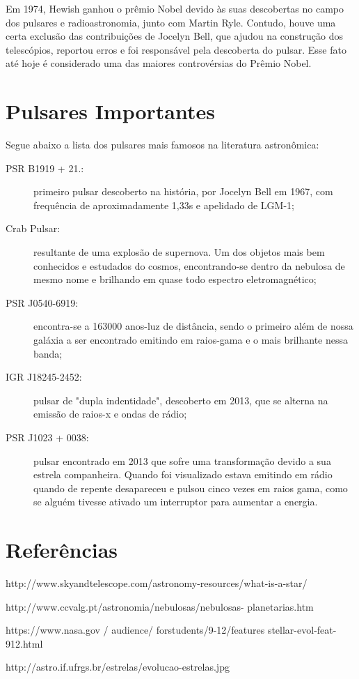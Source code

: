 \documentclass[article,12pt,oneside,a4paper,english,brazil,sumario=tradicional]{abntex2}
\begin{document}
Em 1974, Hewish ganhou o prêmio Nobel devido às suas descobertas no campo dos pulsares e radioastronomia, junto com Martin Ryle. Contudo, houve uma certa exclusão das contribuições de Jocelyn Bell, que ajudou na construção dos telescópios, reportou erros e foi responsável pela descoberta do pulsar. Esse fato até hoje é considerado uma das maiores controvérsias do Prêmio Nobel.

\section{Pulsares Importantes}
Segue abaixo a lista dos pulsares mais famosos na literatura astronômica:
\begin{description}
	\item[PSR B1919 + 21.:] primeiro pulsar descoberto na história, por Jocelyn Bell em 1967, com frequência de aproximadamente 1,33s e apelidado de LGM-1;
	\item[Crab Pulsar:] resultante de uma explosão de supernova. Um dos objetos mais bem conhecidos e estudados do cosmos, encontrando-se dentro da nebulosa de mesmo nome e brilhando em quase todo espectro eletromagnético;
	\item[PSR J0540-6919:] encontra-se a 163000 anos-luz de distância, sendo o primeiro além de nossa galáxia a ser encontrado emitindo em raios-gama e o mais brilhante nessa banda;
	\item[IGR J18245-2452:] pulsar de "dupla indentidade", descoberto em 2013, que se alterna na emissão de raios-x e ondas de rádio;
	\item[PSR J1023 + 0038:] pulsar encontrado em 2013 que sofre uma transformação devido a sua estrela companheira. Quando foi visualizado estava emitindo em rádio quando de repente desapareceu e pulsou cinco vezes em raios gama, como se alguém tivesse ativado um interruptor para aumentar a energia.
\end{description}

\section*{Referências}
http://www.skyandtelescope.com/astronomy-resources/what-is-a-star/

http://www.ccvalg.pt/astronomia/nebulosas/nebulosas- planetarias.htm

https://www.nasa.gov / audience/ forstudents/9-12/features stellar-evol-feat-912.html

http://astro.if.ufrgs.br/estrelas/evolucao-estrelas.jpg
\end{document}
